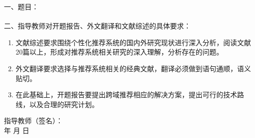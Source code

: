 
\newpage
\thispagestyle{empty}

\begin{tabbing}
\hspace{5mm}\songti\sihao 一、题目：\underline{}
\\ \\
\hspace{5mm}\songti\sihao 二、指导教师对开题报告、外文翻译和文献综述的具体要求：
\end{tabbing}

\begin{enumerate}
\item 文献综述要求围绕个性化推荐系统的国内外研究现状进行深入分析，阅读文献20篇以上，形成对推荐系统相关研究的深入理解，分析存在的问题。
\item 外文翻译要求选择与推荐系统相关的经典文献，翻译必须做到语句通顺，语义贴切。
\item 在此基础上，开题报告要提出跨域推荐相应的解决方案，提出可行的技术路线，以及合理的研究计划。
\end{enumerate}


\vspace{100mm}

\begin{tabbing}
\hspace{80mm}\songti\xiaosi 指导教师（签名）：
\\ \hspace{90mm} \songti\xiaosi 年 \hspace{5mm} \songti\xiaosi 月 \hspace{5mm} \songti\xiaosi 日
\end{tabbing}

